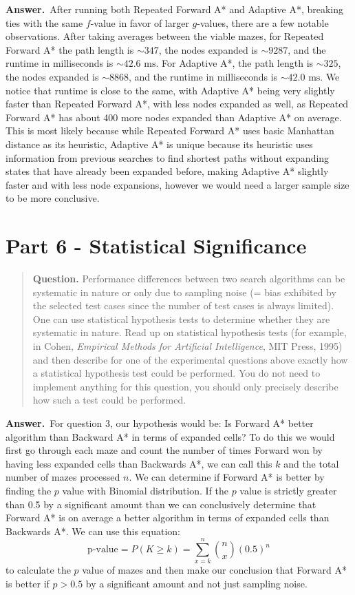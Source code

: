 \documentclass[11pt]{article}
\newcommand{\question}[1]{%
\begin{quote}
\textbf{Question.} #1
\end{quote}
}
\newcommand{\answer}{\textbf{Answer.}\ }
\begin{document}
\answer After running both Repeated Forward A* and Adaptive A*, breaking ties with the same \(f\)-value in favor of larger \(g\)-values, there are a few notable observations. After taking averages between the viable mazes, for Repeated Forward A* the path length is \(\sim 347\), the nodes expanded is \(\sim 9287\), and the runtime in milliseconds is \(\sim 42.6\text{ ms}\). For Adaptive A*, the path length is \(\sim 325\), the nodes expanded is \(\sim 8868\), and the runtime in milliseconds is \(\sim 42.0\text{ ms}\). We notice that runtime is close to the same, with Adaptive A* being very slightly faster than Repeated Forward A*, with less nodes expanded as well, as Repeated Forward A* has about 400 more nodes expanded than Adaptive A* on average. This is most likely because while Repeated Forward A* uses basic Manhattan distance as its heuristic, Adaptive A* is unique because its heuristic uses information from previous searches to find shortest paths without expanding states that have already been expanded before, making Adaptive A* slightly faster and with less node expansions, however we would need a larger sample size to be more conclusive.

\section*{Part 6 - Statistical Significance }
\question{Performance differences between two search algorithms can be systematic in nature or only due to sampling noise (= bias exhibited by the selected test cases since the number of test cases is always limited). One can use statistical hypothesis tests to determine whether they are systematic in nature. Read up on statistical hypothesis tests (for example, in Cohen, \emph{Empirical Methods for Artificial Intelligence}, MIT Press, 1995) and then describe for one of the experimental questions above exactly how a statistical hypothesis test could be performed. You do not need to implement anything for this question, you should only precisely describe how such a test could be performed.}

\answer For question 3, our hypothesis would be: Is Forward A* better algorithm than Backward A* in terms of expanded cells? To do this we would first go through each maze and count the number of times Forward won by having less expanded cells than Backwards A*, we can call this \(k\) and the total number of mazes processed \(n\). We can determine if Forward A* is better by finding the \(p\) value with Binomial distribution. If the \(p\) value is strictly greater than 0.5 by a significant amount than we can conclusively determine that Forward A* is on average a better algorithm in terms of expanded cells than Backwards A*. We can use this equation:
\[
\text{p-value} = P(K \ge k) = \sum_{x=k}^{n} \binom{n}{x}(0.5)^n
\]
to calculate the \(p\) value of mazes and then make our conclusion that Forward A* is better if \(p > 0.5\) by a significant amount and not just sampling noise.
\end{document}
